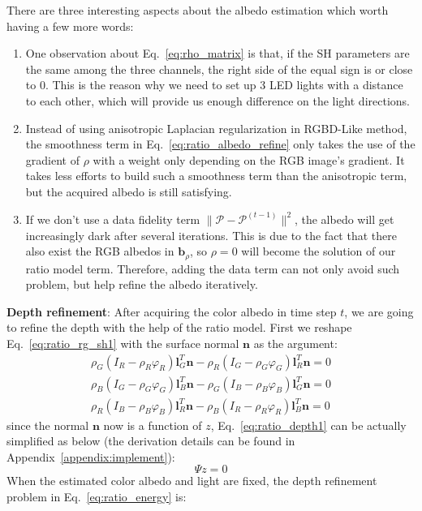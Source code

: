There are three interesting aspects about the albedo estimation which worth having a few more words:
\begin{enumerate}
    \item One observation about Eq.~\ref{eq:rho_matrix} is that, if the SH parameters are the same among the three channels, the right side of the equal sign is or close to 0. 
    This is the reason why we need to set up 3 LED lights with a distance to each other, which will provide us enough difference on the light directions.
    \item Instead of using anisotropic Laplacian regularization in RGBD-Like method, the smoothness term in Eq.~\ref{eq:ratio_albedo_refine} only takes the use of the gradient of $\rho$ with a weight only depending on the RGB image's gradient.
    It takes less efforts to build such a smoothness term than the anisotropic term, but the acquired albedo is still satisfying.
    \item If we don't use a data fidelity term $\lVert \mathcal{P} - \mathcal{P}^{(t-1)}\rVert^2$, the albedo will get increasingly dark after several iterations. 
    This is due to the fact that there also exist the RGB albedos in $\mathbf{b}_{\rho}$, so $\rho = 0$ will become the solution of our ratio model term.
    Therefore, adding the data term can not only avoid such problem, but help refine the albedo iteratively. 
\end{enumerate}

\textbf{Depth refinement}:
After acquiring the color albedo in time step $t$, we are going to refine the depth with the help of the ratio model.
First we reshape Eq.~\ref{eq:ratio_rg_sh1} with the surface normal $\mathbf{n}$ as the argument:
\begin{equation}\label{eq:ratio_depth1}
\begin{split}
\rho_G (I_R - \rho_R \varphi_R)\mathbf{l}_G^T \mathbf{n} - \rho_R (I_G - \rho_G \varphi_G)\mathbf{l}_R^T\mathbf{n} = 0\\
\rho_B (I_G - \rho_G \varphi_G)\mathbf{l}_B^T \mathbf{n} - \rho_G (I_B - \rho_B \varphi_B)\mathbf{l}_G^T\mathbf{n} = 0\\
\rho_R (I_B - \rho_B \varphi_B)\mathbf{l}_R^T \mathbf{n} - \rho_B (I_R - \rho_R \varphi_R)\mathbf{l}_B^T\mathbf{n} = 0 
\end{split}
\end{equation}
since the normal $\mathbf{n}$ now is a function of $z$, Eq.~\ref{eq:ratio_depth1} can be actually simplified as below (the derivation details can be found in Appendix~\ref{appendix:implement}):
\begin{equation}
    \Psi z = 0
\end{equation}
When the estimated color albedo and light are fixed, the depth refinement problem in Eq.~\ref{eq:ratio_energy} is:

